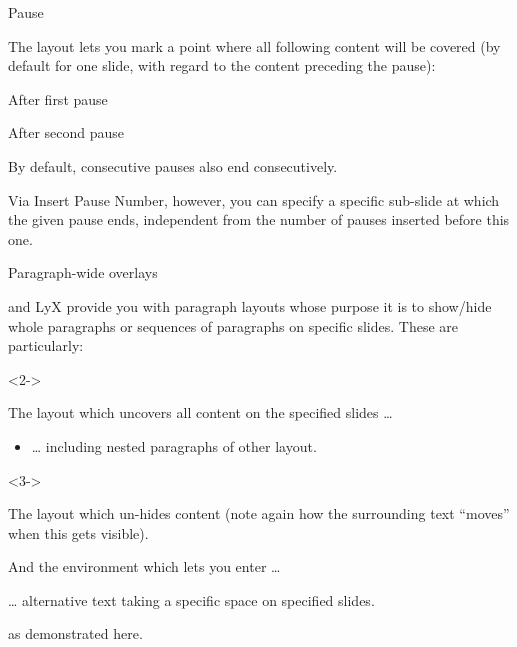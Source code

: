 \documentclass[english]{beamer}
\begin{document}
%
\begin{frame}{Pause}

The  layout lets you mark a point where all following
content will be covered (by default for one slide, with regard to
the content preceding the pause):

\pause{}

After first pause

\pause{}

After second pause

\pause[2]{}

By default, consecutive pauses also end consecutively. 

Via \alert{Insert \textrightarrow Pause Number}, however, you can specify
a specific sub-slide at which the given pause ends, independent from
the number of pauses inserted before this one.
\end{frame}
%
\begin{frame}{Paragraph-wide overlays}

 and LyX provide you with paragraph layouts whose
purpose it is to show/hide whole paragraphs or sequences of paragraphs
on specific slides. These are particularly:
\begin{uncoverenv}<2->

The  layout which uncovers all content on the
specified slides \ldots{}
\begin{itemize}
\item \ldots{} including nested paragraphs of other layout.
\end{itemize}
\end{uncoverenv}

\begin{onlyenv}<3->

The  layout which un-hides content (note again how
the surrounding text ``moves'' when this gets visible).
\end{onlyenv}

\begin{overprint}

And the  environment which lets you enter \ldots{}

\ldots{} alternative text taking a specific space on specified slides.

\end{overprint}
as demonstrated here.
\end{frame}
%
\end{document}
